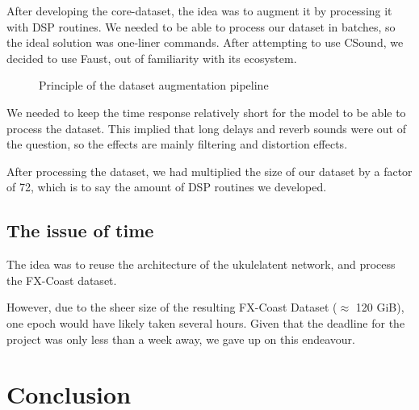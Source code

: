 \documentclass[11pt, english]{article}
\begin{document}
After developing the core-dataset, the idea was to augment it by processing it with DSP routines.
We needed to be able to process our dataset in batches, so the ideal solution was one-liner commands. After attempting to use CSound, we decided to use Faust, out of familiarity with its ecosystem.

\begin{figure}[h]
\center
{}
    \caption{Principle of the dataset augmentation pipeline}
    \label{fig:sch1}
\end{figure}

We needed to keep the time response relatively short for the model to be able to process the dataset. This implied that long delays and reverb sounds were out of the question, so the effects are mainly filtering and distortion effects.

After processing the dataset, we had multiplied the size of our dataset by a factor of 72, which is to say the amount of DSP routines we developed.

\subsection{The issue of time}
The idea was to reuse the architecture of the ukulelatent network, and process the FX-Coast dataset.

However, due to the sheer size of the resulting FX-Coast Dataset ($\approx$ 120 GiB), one epoch would have likely taken several hours. Given that the deadline for the project was only less than a week away, we gave up on this endeavour.

\section*{Conclusion}
\end{document}
